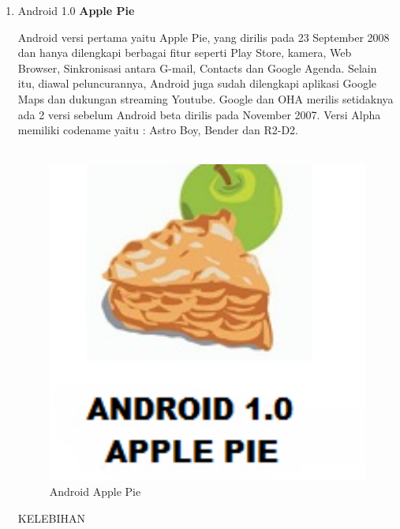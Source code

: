 \begin{enumerate}

\item Android 1.0 \textbf{Apple Pie}

Android versi pertama yaitu Apple Pie, yang dirilis pada 23 September 2008 dan hanya dilengkapi berbagai fitur seperti Play Store, kamera, Web Browser, Sinkronisasi antara G-mail, Contacts dan Google Agenda. Selain itu, diawal peluncurannya, Android juga sudah dilengkapi aplikasi Google Maps dan dukungan streaming Youtube. Google dan OHA merilis setidaknya ada 2 versi sebelum Android beta dirilis pada November 2007. Versi Alpha memiliki codename yaitu : Astro Boy, Bender dan R2-D2.\\
\\

\begin{figure}[]
    \centering
    \includegraphics[scale = 0.3]{pictures/asd.jpg}
    \caption{Android Apple Pie}
    \label{}
\end{figure}
KELEBIHAN\\
\begin{enumerate}


\end{enumerate}
\end{enumerate}
